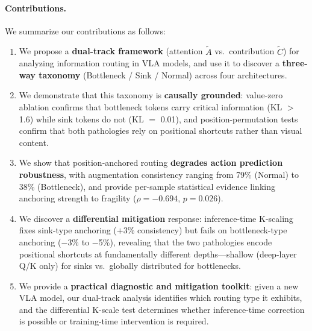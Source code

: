 \paragraph{Contributions.}
We summarize our contributions as follows:
\begin{enumerate}[leftmargin=*,nosep]
    \item We propose a \textbf{dual-track framework} (attention $\tilde{A}$ vs.\ contribution $\tilde{C}$) for analyzing information routing in VLA models, and use it to discover a \textbf{three-way taxonomy} (Bottleneck / Sink / Normal) across four architectures.

    \item We demonstrate that this taxonomy is \textbf{causally grounded}: value-zero ablation confirms that bottleneck tokens carry critical information (KL $>$ 1.6) while sink tokens do not (KL $=$ 0.01), and position-permutation tests confirm that both pathologies rely on positional shortcuts rather than visual content.

    \item We show that position-anchored routing \textbf{degrades action prediction robustness}, with augmentation consistency ranging from 79\% (Normal) to 38\% (Bottleneck), and provide per-sample statistical evidence linking anchoring strength to fragility ($\rho = -0.694$, $p = 0.026$).

    \item We discover a \textbf{differential mitigation} response: inference-time K-scaling fixes sink-type anchoring ($+$3\% consistency) but fails on bottleneck-type anchoring ($-$3\% to $-$5\%), revealing that the two pathologies encode positional shortcuts at fundamentally different depths---shallow (deep-layer Q/K only) for sinks vs.\ globally distributed for bottlenecks.

    \item We provide a \textbf{practical diagnostic and mitigation toolkit}: given a new VLA model, our dual-track analysis identifies which routing type it exhibits, and the differential K-scale test determines whether inference-time correction is possible or training-time intervention is required.
\end{enumerate}
